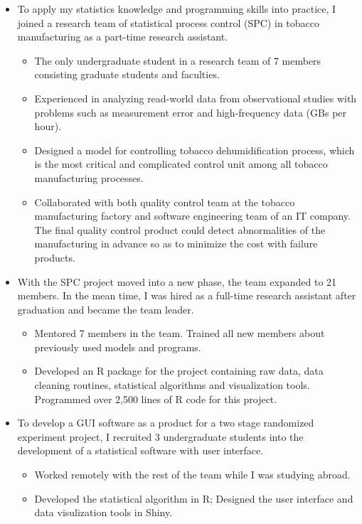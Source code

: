 \documentclass[11pt]{article}
\begin{document}
\begin{itemize}
	\item To apply my statistics knowledge and programming skills into practice, I joined a research team of statistical process control (SPC) in tobacco manufacturing as a part-time research assistant.
	\begin{itemize}
		\item The only undergraduate student in a research team of 7 members consisting graduate students and faculties.
		\item Experienced in analyzing read-world data from observational studies with problems such as measurement error and high-frequency data (GBs per hour).
		\item Designed a model for controlling tobacco dehumidification process, which is the most critical and complicated control unit among all tobacco manufacturing processes.
		\item Collaborated with both quality control team at the tobacco manufacturing factory and software engineering team of an IT company. The final quality control product could detect abnormalities of the manufacturing in advance so as to minimize the cost with failure products.
	\end{itemize}

	\item With the SPC project moved into a new phase, the team expanded to 21 members. In the mean time, I was hired as a full-time research assistant after graduation and became the team leader.
	\begin{itemize}
		\item Mentored 7 members in the team. Trained all new members about previously used models and programs.
		\item  Developed an R package for the project containing raw data, data cleaning routines, statistical algorithms and visualization tools. Programmed over 2,500 lines of R code for this project.
	\end{itemize}

	\item To develop a GUI software as a product for a two stage randomized experiment project, I recruited 3 undergraduate students into the development of a statistical software with user interface.
	\begin{itemize}
		\item Worked remotely with the rest of the team while I was studying abroad.
		\item Developed the statistical algorithm in R; Designed the user interface and data visulization tools in Shiny.
	\end{itemize}
\end{itemize}
\end{document}
